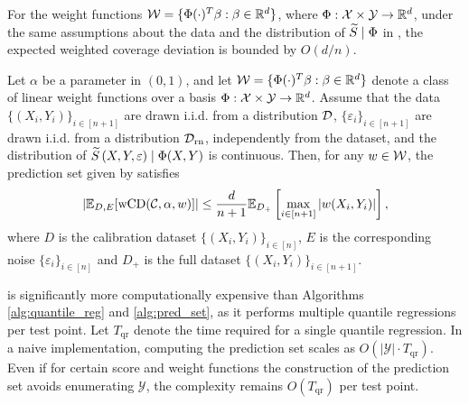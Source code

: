 For the weight functions ${\cal W} = \{\Phi(\cdot)^T \beta :\beta \in \mathbb{R}^d\}$, where $\Phi : {\cal X} \times {\cal Y} \to \mathbb{R}^d$, under the same assumptions about the data and the distribution of ${\widetilde{S}}\mid\Phi$ in , the expected weighted coverage deviation is bounded by $O(d/n)$.

\begin{theorem}
    Let $\alpha$ be a parameter in $(0,1)$, and let ${\cal W} = \{\Phi(\cdot)^T \beta :\beta \in \mathbb{R}^d\}$ denote a class of linear weight functions over a basis $\Phi : {\cal X} \times {\cal Y} \to \mathbb{R}^d$. Assume that the data $\{(X_i,Y_i)\}_{i\in [n+1]}$ are drawn \mbox{i.i.d.} from a distribution ${\cal D}$, $\{\varepsilon_i\}_{i\in [n+1]}$ are drawn \mbox{i.i.d.} from a distribution ${\cal D}_{\text{rn}}$, independently from the dataset, and the distribution of ${\widetilde{S}}\left(X,Y, \varepsilon\right) \mid \Phi(X,Y)$ is continuous. Then, for any $w \in {\cal W}$, the prediction set given by  satisfies 
    \begin{align*}
       |\mathbb{E}_{D,E} [ \text{wCD}({\cal C}, \alpha,w)]| \leq \frac{d}{n+1} \mathbb{E}_{D_{+}}\left[ \max_{i \in [n+1]}|w(X_i,Y_i)|\right],
    \end{align*}
    where $D$ is the calibration dataset $\{(X_i,Y_i)\}_{i\in[n]}$, $E$ is the corresponding noise $\{\varepsilon_i\}_{i \in [n]}$ and $D_{+}$ is the full dataset $\{(X_i,Y_i)\}_{i\in[n+1]}$.
   \label{thm:tt-cond}
\end{theorem}



 is significantly more computationally expensive than Algorithms \ref{alg:quantile_reg} and \ref{alg:pred_set}, as it performs multiple quantile regressions per test point. Let  $T_{\text{qr}}$  denote the time required for a single quantile regression. In a naive implementation, computing the prediction set scales as  $O(|\mathcal{Y}| \cdot T_{\text{qr}})$. Even if for certain score and weight functions the construction of the prediction set avoids enumerating $\mathcal{Y}$, the complexity remains  $O(T_{\text{qr}})$ per test point.